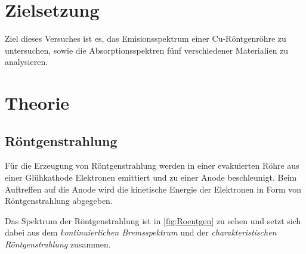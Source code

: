 \section{Zielsetzung}

Ziel dieses Versuches ist es, das Emisionsspektrum einer Cu-Röntgenröhre zu untersuchen,
sowie die Absorptionsspektren fünf verschiedener Materialien zu analysieren.

\section{Theorie}
\label{sec:Theorie}

\subsection{Röntgenstrahlung}
\label{sec:Röntgenstrahlung}

Für die Erzeugung von Röntgenstrahlung werden in einer evakuierten Röhre aus einer Glühkathode Elektronen emittiert
und zu einer Anode beschleunigt. Beim Auftreffen auf die Anode wird die kinetische Energie der Elektronen in Form von
Röntgenstrahlung abgegeben.

Das Spektrum der Röntgenstrahlung ist in \autoref{fig:Roentgen} zu sehen und setzt sich dabei aus dem
\textit{kontinuierlichen Bremsspektrum} und der \textit{charakteristischen Röntgenstrahlung} zusammen.

